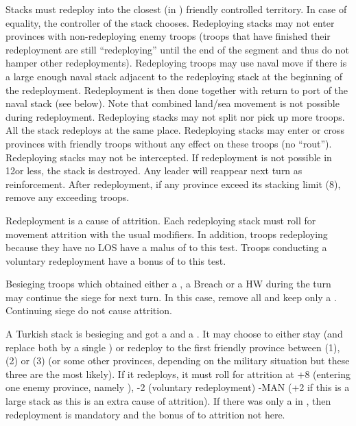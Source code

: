 \bparag Stacks must redeploy into the closest (in \MP) friendly controlled
territory. In case of equality, the controller of the stack chooses.
\bparag Redeploying stacks may not enter provinces with non-redeploying enemy
troops (troops that have finished their redeployment are still ``redeploying''
until the end of the segment and thus do not hamper other redeployments).
\bparag Redeploying troops may use naval move if there is a large enough naval
stack adjacent to the redeploying stack at the beginning of the
redeployment. Redeployment is then done together with return to port of the
naval stack (see below). Note that combined land/sea movement is not possible
during redeployment.
\bparag Redeploying stacks may not split nor pick up more troops. All the
stack redeploys at the same place.
\bparag Redeploying stacks may enter or cross provinces with friendly troops
without any effect on these troops (no ``rout'').
\bparag Redeploying stacks may not be intercepted.
\bparag If redeployment is not possible in 12\MP or less, the stack is
destroyed. Any leader will reappear next turn as reinforcement.
\bparag After redeployment, if any province exceed its stacking limit (8\LD),
remove any exceeding troops.

\bparag Redeployment is a cause of attrition. Each redeploying stack must roll
for movement attrition with the usual modifiers.
\bparag In addition, troops redeploying because they have no LOS have a malus
of  to this test.
\bparag Troops conducting a voluntary redeployment have a bonus of 
to this test.

\bparag Besieging troops which obtained either a \USURE\Faceplus, a Breach or
a HW during the turn may continue the siege for next turn.
\bparag In this case, remove all \USURE and keep only a \USURE\Facemoins.
\bparag Continuing siege do not cause attrition.

\begin{exemple}
  A Turkish stack is besieging \provinceBanat and got a \USURE\Faceplus and a
  \USURE\Facemoins. It may choose to either stay (and replace both \USURE by a
  single \USURE\Facemoins) or redeploy to the first friendly province between
  \provinceValahia (1\MP), \provinceSerbia (2\MP) or \provinceBulgaristan
  (3\MP) (or some other provinces, depending on the military situation but
  these three are the most likely). If it redeploys, it must roll for
  attrition at +8 (entering one enemy province, namely \provinceBanat), -2
  (voluntary redeployment) -MAN (+2 if this is a large stack as this is an
  extra cause of attrition). If there was only a \USURE\Facemoins in
  \provinceBanat, then redeployment is mandatory and the bonus of 
  to attrition not here.
\end{exemple}  

